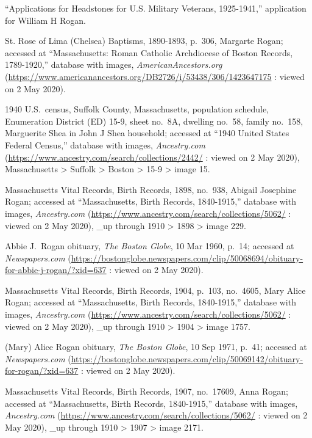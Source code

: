 \begin{thebibliography}{999}
``Applications for Headstones for U.S. Military Veterans, 1925-1941,'' application for William H Rogan.

St. Rose of Lima (Chelsea) Baptisms, 1890-1893, p.\ 306, Margarte Rogan; accessed at ``Massachusetts: Roman Catholic Archdiocese of Boston Records, 1789-1920,'' database with images, \textit{AmericanAncestors.org} (\url{https://www.americanancestors.org/DB2726/i/53438/306/1423647175} : viewed on 2 May 2020).

1940 U.S.\ census, Suffolk County, Massachusetts, population schedule, Enumeration District (ED) 15-9, sheet no.\ 8A, dwelling no.\ 58, family no.\ 158, Marguerite Shea in John J Shea household; accessed at ``1940 United States Federal Census,'' database with images, \textit{Ancestry.com} (\url{https://www.ancestry.com/search/collections/2442/} : viewed on 2 May 2020), Massachusetts > Suffolk > Boston > 15-9 > image 15.

Massachusetts Vital Records, Birth Records, 1898, no.\ 938, Abigail Josephine Rogan; accessed at ``Massachusetts, Birth Records, 1840-1915,'' database with images, \textit{Ancestry.com} (\url{https://www.ancestry.com/search/collections/5062/} : viewed on 2 May 2020), \_up through 1910 > 1898 > image 229.

Abbie J.\ Rogan obituary, \textit{The Boston Globe}, 10 Mar 1960, p.\ 14; accessed at \textit{Newspapers.com} (\url{https://bostonglobe.newspapers.com/clip/50068694/obituary-for-abbie-j-rogan/?xid=637} : viewed on 2 May 2020).

Massachusetts Vital Records, Birth Records, 1904, p.\ 103, no.\ 4605, Mary Alice Rogan; accessed at ``Massachusetts, Birth Records, 1840-1915,'' database with images, \textit{Ancestry.com} (\url{https://www.ancestry.com/search/collections/5062/} : viewed on 2 May 2020), \_up through 1910 > 1904 > image 1757.

(Mary) Alice Rogan obituary, \textit{The Boston Globe}, 10 Sep 1971, p.\ 41; accessed at \textit{Newspapers.com} (\url{https://bostonglobe.newspapers.com/clip/50069142/obituary-for-rogan/?xid=637} : viewed on 2 May 2020).

Massachusetts Vital Records, Birth Records, 1907, no.\ 17609, Anna Rogan; accessed at ``Massachusetts, Birth Records, 1840-1915,'' database with images, \textit{Ancestry.com} (\url{https://www.ancestry.com/search/collections/5062/} : viewed on 2 May 2020), \_up through 1910 > 1907 > image 2171.


\end{thebibliography}
